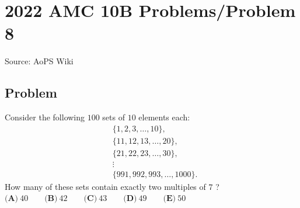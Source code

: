 \documentclass[12pt]{article}
\begin{document}
\section*{{2022 AMC 10B Problems/Problem 8}}
Source: AoPS Wiki

\subsection*{Problem}
Consider the following $100$ sets of $10$ elements each: \begin{align*} &\{1,2,3,\ldots,10\}, \\ &\{11,12,13,\ldots,20\},\\ &\{21,22,23,\ldots,30\},\\ &\vdots\\ &\{991,992,993,\ldots,1000\}. \end{align*} How many of these sets contain exactly two multiples of $7$ ? $\textbf{(A)}\ 40\qquad\textbf{(B)}\ 42\qquad\textbf{(C)}\ 43\qquad\textbf{(D)}\ 49\qquad\textbf{(E)}\ 50$
\end{document}
